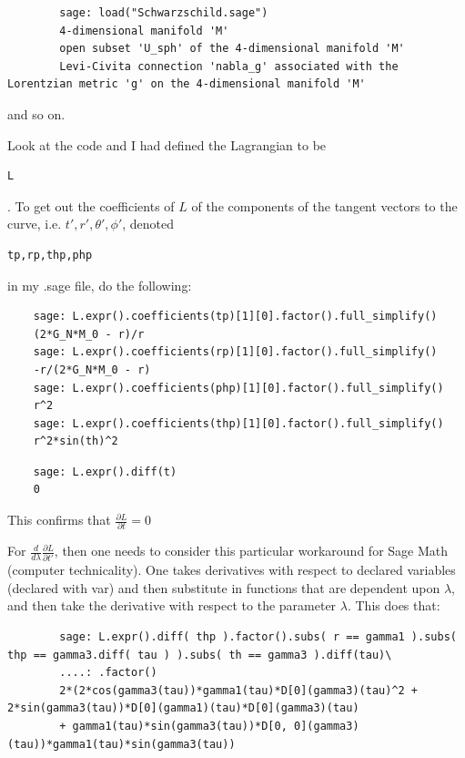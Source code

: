 	{\scriptsize
		\begin{verbatim}
		sage: load("Schwarzschild.sage")
		4-dimensional manifold 'M'
		open subset 'U_sph' of the 4-dimensional manifold 'M'
		Levi-Civita connection 'nabla_g' associated with the Lorentzian metric 'g' on the 4-dimensional manifold 'M'
		\end{verbatim}}
	and so on.
	
	Look at the code and I had defined the Lagrangian to be \begin{verbatim}L\end{verbatim}.  To get out the coefficients of $L$ of the components of the tangent vectors to the curve, i.e. $t', r',\theta',\phi'$, denoted \begin{verbatim}tp,rp,thp,php\end{verbatim} in my .sage file, do the following:
	
	\begin{verbatim}
	sage: L.expr().coefficients(tp)[1][0].factor().full_simplify()
	(2*G_N*M_0 - r)/r
	sage: L.expr().coefficients(rp)[1][0].factor().full_simplify()
	-r/(2*G_N*M_0 - r)
	sage: L.expr().coefficients(php)[1][0].factor().full_simplify()
	r^2
	sage: L.expr().coefficients(thp)[1][0].factor().full_simplify()
	r^2*sin(th)^2
	\end{verbatim}
	
	
	\begin{verbatim}
	sage: L.expr().diff(t)
	0
	\end{verbatim}
	This confirms that $\frac{ \partial L}{ \partial t} =0$
	
	For $\frac{d}{d\lambda} \frac{ \partial L}{ \partial t'}$, then one needs to consider this particular workaround for Sage Math (computer technicality).  One takes derivatives with respect to declared variables (declared with var) and then substitute in functions that are dependent upon $\lambda$, and then take the derivative with respect to the parameter $\lambda$.  This does that:
	
	{\scriptsize
		\begin{verbatim}
		sage: L.expr().diff( thp ).factor().subs( r == gamma1 ).subs( thp == gamma3.diff( tau ) ).subs( th == gamma3 ).diff(tau)\
		....: .factor()
		2*(2*cos(gamma3(tau))*gamma1(tau)*D[0](gamma3)(tau)^2 + 2*sin(gamma3(tau))*D[0](gamma1)(tau)*D[0](gamma3)(tau) 
		+ gamma1(tau)*sin(gamma3(tau))*D[0, 0](gamma3)(tau))*gamma1(tau)*sin(gamma3(tau))
		\end{verbatim} }
	
